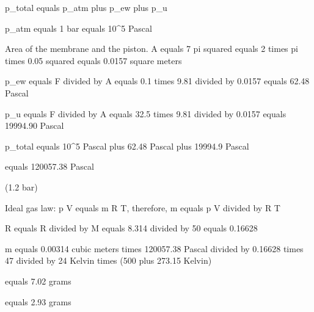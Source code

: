 p_total equals p_atm plus p_ew plus p_u

p_atm equals 1 bar equals 10^5 Pascal

Area of the membrane and the piston.
A equals 7 pi squared equals 2 times pi times 0.05 squared
equals 0.0157 square meters

p_ew equals F divided by A equals 0.1 times 9.81 divided by 0.0157 equals 62.48 Pascal

p_u equals F divided by A equals 32.5 times 9.81 divided by 0.0157 equals 19994.90 Pascal

p_total equals 10^5 Pascal plus 62.48 Pascal plus 19994.9 Pascal

equals 120057.38 Pascal

(1.2 bar)

Ideal gas law: p V equals m R T, therefore, m equals p V divided by R T

R equals R divided by M equals 8.314 divided by 50 equals 0.16628

m equals 0.00314 cubic meters times 120057.38 Pascal divided by 0.16628 times 47 divided by 24 Kelvin times (500 plus 273.15 Kelvin)

equals 7.02 grams

equals 2.93 grams
